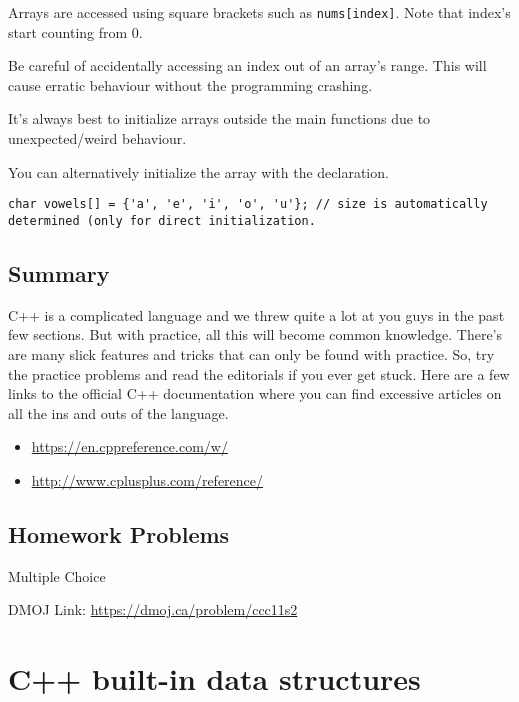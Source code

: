 \documentclass{report}
\newcommand{\problem}[2]{
    \begin{problembox}
        #1
        
        DMOJ Link: \href{#2}{#2}
    \end{problembox}
}
\begin{document}
\begin{note}
    Arrays are accessed using square brackets such as \lstinline{nums[index]}. Note that index's start counting from 0.
\end{note}

\begin{principle}
    Be careful of accidentally accessing an index out of an array's range. This will cause erratic behaviour without the programming crashing.
\end{principle}

\begin{principle}
    It's always best to initialize arrays outside the main functions due to unexpected/weird behaviour. 
\end{principle}

You can alternatively initialize the array with the declaration. 

\begin{lstlisting}[caption=Array initialization]
char vowels[] = {'a', 'e', 'i', 'o', 'u'}; // size is automatically determined (only for direct initialization.
\end{lstlisting}

\subsection{Summary}
C++ is a complicated language and we threw quite a lot at you guys in the past few sections. But with practice, all this will become common knowledge. There's are many slick features and tricks that can only be found with practice. So, try the practice problems and read the editorials if you ever get stuck. Here are a few links to the official C++ documentation where you can find excessive articles on all the ins and outs of the language.

\begin{itemize}
    \item \url{https://en.cppreference.com/w/}
    \item \url{http://www.cplusplus.com/reference/}
\end{itemize}

\subsection{Homework Problems}
\problem{Multiple Choice}{https://dmoj.ca/problem/ccc11s2}

\section{C++ built-in data structures}
\end{document}
